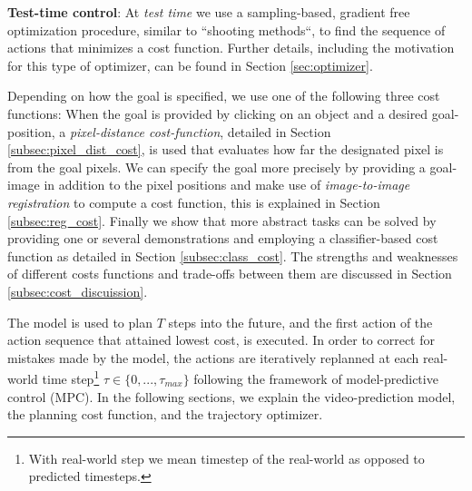 \noindent \textbf{Test-time control}: At \emph{test time} we use a sampling-based, gradient free optimization procedure, similar to ``shooting methods``, to find the sequence of actions that minimizes a cost function. Further details, including the motivation for this type of optimizer, can be found in Section \ref{sec:optimizer}. 

Depending on how the goal is specified, we use one of the following three cost functions: When the goal is provided by clicking on an object and a desired goal-position, a \emph{pixel-distance cost-function}, detailed in Section \ref{subsec:pixel_dist_cost}, is used that evaluates how far the designated pixel is from the goal pixels. We can specify the goal more precisely by providing a goal-image in addition to the pixel positions and make use of \emph{image-to-image registration} to compute a cost function, this is explained in Section \ref{subsec:reg_cost}. Finally we show that more abstract tasks can be solved by providing one or several demonstrations and employing a classifier-based cost function as detailed in Section \ref{subsec:class_cost}. The strengths and weaknesses of different costs functions and trade-offs between them are discussed in Section \ref{subsec:cost_discuission}. 

The model is used to plan $T$ steps into the future, and the first action of the action sequence that attained lowest cost, is executed. In order to correct for mistakes made by the model, the actions are iteratively replanned at each real-world time step\footnote{With real-world step we mean timestep of the real-world as opposed to predicted timesteps.} $\tau \in \{0,...,\tau_{max}\}$ following the framework of model-predictive control (MPC). 
In the following sections, we explain the video-prediction model, the planning cost function, and the trajectory optimizer.








